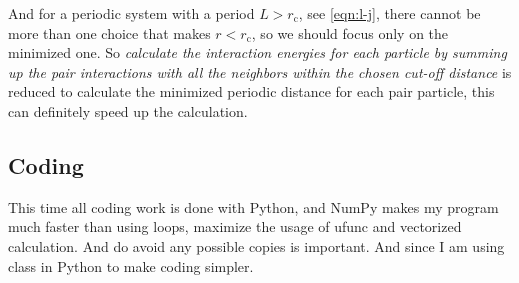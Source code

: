 \documentclass[UTF8,a4paper]{article}
\begin{document}
\begin{enumerate}
	      And for a periodic system with a period $L > r_\text{c}$, see \eqref{eqn:l-j}, there cannot be more than one choice that makes $r < r_\text{c}$, so we should focus only on the minimized one. So
	      \textit{calculate the interaction energies for each particle by summing up the pair interactions with all the neighbors within the chosen cut-off distance} is reduced to calculate the minimized periodic
	      distance for each pair particle, this can definitely speed up the calculation.
\end{enumerate}
\subsection{Coding}
This time all coding work is done with Python, and NumPy makes my program much faster than using loops, maximize the usage of ufunc and vectorized calculation. And do avoid any possible copies is important.
And since I am using class in Python to make coding simpler.
\end{document}
